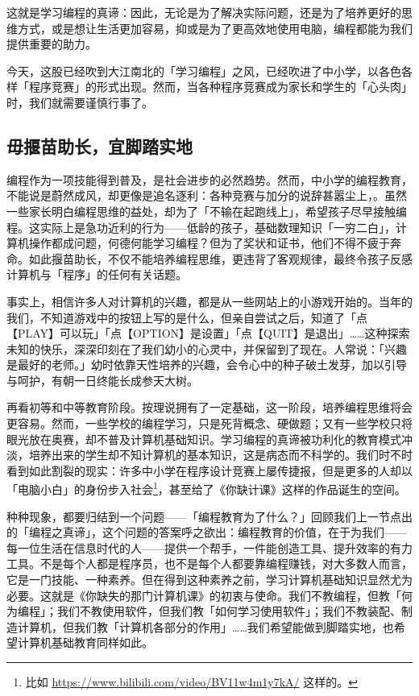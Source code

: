 这就是学习编程的真谛：因此，无论是为了解决实际问题，还是为了培养更好的思维方式，或是想让生活更加容易，抑或是为了更高效地使用电脑，编程都能为我们提供重要的助力。

今天，这股已经吹到大江南北的「学习编程」之风，已经吹进了中小学，以各色各样「程序竞赛」的形式出现。然而，当各种程序竞赛成为家长和学生的「心头肉」时，我们就需要谨慎行事了。

\subsection{毋揠苗助长，宜脚踏实地}

编程作为一项技能得到普及，是社会进步的必然趋势。然而，中小学的编程教育，不能说是蔚然成风，却更像是追名逐利：各种竞赛与加分的说辞甚嚣尘上，。虽然一些家长明白编程思维的益处，却为了「不输在起跑线上」，希望孩子尽早接触编程。这实际上是急功近利的行为——低龄的孩子，基础数理知识「一穷二白」，计算机操作都成问题，何德何能学习编程？但为了奖状和证书，他们不得不疲于奔命。如此揠苗助长，不仅不能培养编程思维，更违背了客观规律，最终令孩子反感计算机与「程序」的任何有关话题。

事实上，相信许多人对计算机的兴趣，都是从一些网站上的小游戏开始的。当年的我们，不知道游戏中的按钮上写的是什么，但亲自尝试之后，知道了「点【PLAY】可以玩」「点【OPTION】是设置」「点【QUIT】是退出」……这种探索未知的快乐，深深印刻在了我们幼小的心灵中，并保留到了现在。人常说：「兴趣是最好的老师。」幼时依靠天性培养的兴趣，会令心中的种子破土发芽，加以引导与呵护，有朝一日终能长成参天大树。

再看初等和中等教育阶段。按理说拥有了一定基础，这一阶段，培养编程思维将会更容易。然而，一些学校的编程学习，只是死背概念、硬做题；又有一些学校只将眼光放在奥赛，却不普及计算机基础知识。学习编程的真谛被功利化的教育模式冲淡，培养出来的学生却不知计算机的基本知识，这是病态而不科学的。我们时不时看到如此割裂的现实：许多中小学在程序设计竞赛上屡传捷报，但是更多的人却以「电脑小白」的身份步入社会\footnote{比如 \url{https://www.bilibili.com/video/BV11w4m1y7kA/} 这样的。}，甚至给了《你缺计课》这样的作品诞生的空间。

种种现象，都要归结到一个问题——「编程教育为了什么？」回顾我们上一节点出的「编程之真谛」，这个问题的答案呼之欲出：编程教育的价值，在于为我们——每一位生活在信息时代的人——提供一个帮手，一件能创造工具、提升效率的有力工具。不是每个人都是程序员，也不是每个人都要靠编程赚钱，对大多数人而言，它是一门技能、一种素养。但在得到这种素养之前，学习计算机基础知识显然尤为必要。这就是《你缺失的那门计算机课》的初衷与使命。我们不教编程，但教「何为编程」；我们不教使用软件，但我们教「如何学习使用软件」；我们不教装配、制造计算机，但我们教「计算机各部分的作用」……我们希望能做到脚踏实地，也希望计算机基础教育同样如此。


